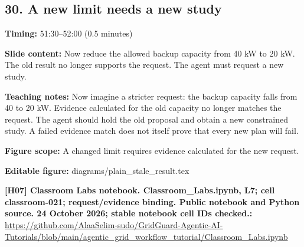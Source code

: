 \documentclass[10pt,letterpaper]{article}
\begin{document}
\subsection*{30. A new limit needs a new study}
\textbf{Timing:} 51:30--52:00 (0.5 minutes)\par
\textbf{Slide content:} Now reduce the allowed backup capacity from 40 kW to 20 kW.
The old result no longer supports the request. The agent must request a new study.\par
\textbf{Teaching notes:} Now imagine a stricter request: the backup capacity falls from 40 to 20 kW. Evidence calculated for the old capacity no longer matches the request. The agent should hold the old proposal and obtain a new constrained study. A failed evidence match does not itself prove that every new plan will fail.\par
\textbf{Figure scope:} A changed limit requires evidence calculated for the new request.\par
\textbf{Editable figure:} diagrams/plain\_stale\_result.tex\par
\textbf{[H07] Classroom Labs notebook. Classroom\_Labs.ipynb, L7; cell classroom-021; request/evidence binding. Public notebook and Python source. 24 October 2026; stable notebook cell IDs checked.:} \href{https://github.com/AlaaSelim-sudo/GridGuard-Agentic-AI-Tutorials/blob/main/agentic_grid_workflow_tutorial/Classroom_Labs.ipynb}{\small\ttfamily https:/\allowbreak{}/\allowbreak{}github.\allowbreak{}com/\allowbreak{}AlaaSelim-\allowbreak{}sudo/\allowbreak{}GridGuard-\allowbreak{}Agentic-\allowbreak{}AI-\allowbreak{}Tutorials/\allowbreak{}blob/\allowbreak{}main/\allowbreak{}agentic\_\allowbreak{}grid\_\allowbreak{}workflow\_\allowbreak{}tutorial/\allowbreak{}Classroom\_\allowbreak{}Labs.\allowbreak{}ipynb}\par
\par\medskip
\end{document}

